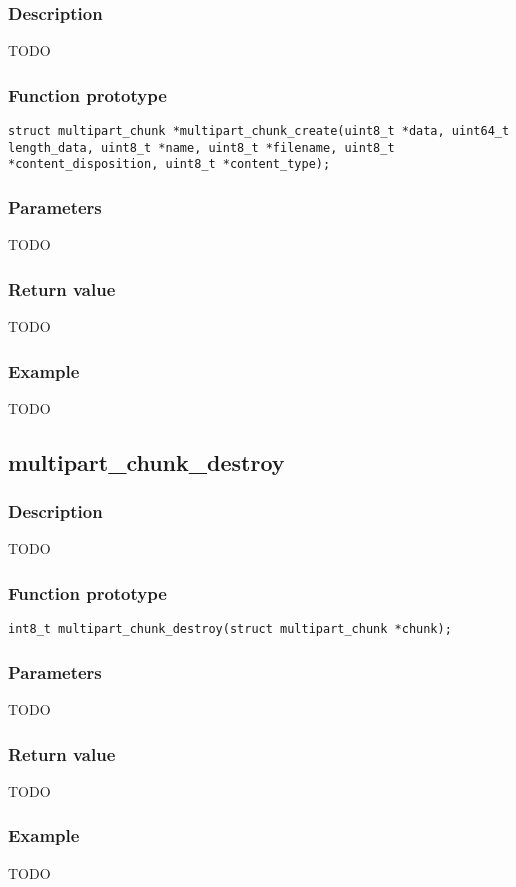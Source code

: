 \subsubsection*{Description}
TODO

\subsubsection*{Function prototype}
\texttt{struct multipart\_chunk *multipart\_chunk\_create(uint8\_t *data, uint64\_t length\_data, uint8\_t *name, uint8\_t *filename, uint8\_t *content\_disposition, uint8\_t *content\_type);}

\subsubsection*{Parameters}
TODO
\subsubsection*{Return value}
TODO
\subsubsection*{Example}
TODO


\subsection{multipart\_chunk\_destroy}

\subsubsection*{Description}
TODO

\subsubsection*{Function prototype}
\texttt{int8\_t multipart\_chunk\_destroy(struct multipart\_chunk *chunk);}

\subsubsection*{Parameters}
TODO
\subsubsection*{Return value}
TODO
\subsubsection*{Example}
TODO


